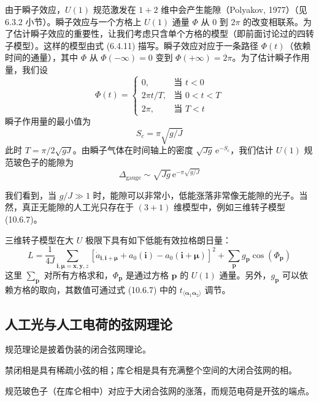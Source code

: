 由于瞬子效应，$U(1)$ 规范激发在 $1+2$ 维中会产生能隙（Polyakov, 1977）（见 6.3.2 小节）。瞬子效应与一个方格上 $U(1)$ 通量 $\Phi$ 从 0 到 $2\pi$ 的改变相联系。为了估计瞬子效应的重要性，让我们考虑只含单个方格的模型（即前面讨论过的四转子模型）。这样的模型由式 (6.4.11) 描写。瞬子效应对应于一条路径 $\Phi(t)$（依赖时间的通量），其中 $\Phi$ 从 $\Phi(-\infty)=0$ 变到 $\Phi(+\infty)=2\pi$。为了估计瞬子作用量，我们设
\begin{equation*}
\Phi(t)=\left\{\begin{array}{ll}0,&\text{当 } t<0\\ 2\pi t/T,&\text{当 } 0<t<T\\ 2\pi,&\text{当 } T<t\end{array}\right.
\end{equation*}
瞬子作用量的最小值为
\begin{equation*}
S_c=\pi\sqrt{g/J}
\end{equation*}
此时 $T=\pi/2\sqrt{gJ}$。由瞬子气体在时间轴上的密度 $\sqrt{Jg}\,\mathrm{e}^{-S_c}$，我们估计 $U(1)$ 规范玻色子的能隙为
\begin{equation*}
\Delta_{\mathrm{gauge}}\sim\sqrt{Jg}\,\mathrm{e}^{-\pi\sqrt{g/J}}\tag{10.6.10}
\end{equation*}

我们看到，当 $g/J\gg1$ 时，能隙可以非常小，低能涨落非常像无能隙的光子。当然，真正无能隙的人工光只存在于 $(3+1)$ 维模型中，例如三维转子模型 (10.6.7)。

三维转子模型在大 $U$ 极限下具有如下低能有效拉格朗日量：
\begin{equation*}
L=\frac{1}{4J}\sum_{\pmb i,\pmb\mu=\pmb x,\pmb y,z}[\dot{a}_{\pmb i,\pmb i+\pmb\mu}+a_0(\pmb i)-a_0(\pmb i+\pmb\mu)]^{2}+\sum_{\pmb p}g_{\pmb p}\cos(\Phi_{\pmb p})\tag{10.6.11}
\end{equation*}
这里 $\sum_{\pmb p}$ 对所有方格求和，$\Phi_{\pmb p}$ 是通过方格 $\pmb p$ 的 $U(1)$ 通量。另外，$g_{\pmb p}$ 可以依赖方格的取向，其数值可通过式 (10.6.7) 中的 $t_{\langle\pmb\alpha_1\pmb\alpha_2\rangle}$ 调节。

\subsection{人工光与人工电荷的弦网理论}

\begin{keypoints}
\item 规范理论是披着伪装的闭合弦网理论。
\item 禁闭相是具有稀疏小弦的相；库仑相是具有充满整个空间的大闭合弦网的相。
\item 规范玻色子（在库仑相中）对应于大闭合弦网的涨落，而规范电荷是开弦的端点。
\end{keypoints}

